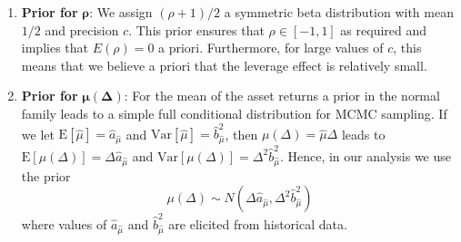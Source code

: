 \documentclass[10pt]{article}
\newcommand{\E}[1]{\mbox{E}\left[#1\right]}
\newcommand{\Var}[1]{\mbox{Var}\left[#1\right]}
\begin{document}
\begin{enumerate}[]


\item{\textbf{Prior for } $\boldsymbol{\rho}$:} We assign $(\rho + 1)/2$ a symmetric beta distribution with mean $1/2$ and precision $c$.  This prior ensures that $\rho \in [-1,1]$ as required and implies that $E(\rho) = 0$ a priori.  Furthermore, for large values of $c$, this means that we believe a priori that the  leverage effect is relatively small.


\item{\textbf{Prior for } $\boldsymbol{\mu}(\boldsymbol{\Delta})$:} For the mean of the asset returns a prior in the normal family leads to a simple full conditional distribution for MCMC sampling.  If we let $\E{ \hat{\mu} } = \hat{a}_{\hat{\mu}}$ and $\Var{ \hat{\mu} } = \hat{b}^2_{\hat{\mu}}$, then $\mu(\Delta) = \hat{\mu} \Delta$ leads to $\E{ \mu(\Delta) } = \Delta \hat{a}_{\hat{\mu}}$ and $\Var{ \mu(\Delta) } = \Delta^2 \hat{b}^2_{\hat{\mu}}$.  Hence, in our analysis we use the prior
$$
\mu(\Delta) \sim N(\Delta \hat{a}_{\hat{\mu}}, \Delta^2 \hat{b}^2_{\hat{\mu}})
$$
where values of $\hat{a}_{\hat{\mu}}$ and $\hat{b}^2_{\hat{\mu}}$ are elicited from historical data.



\end{enumerate}
\end{document}
